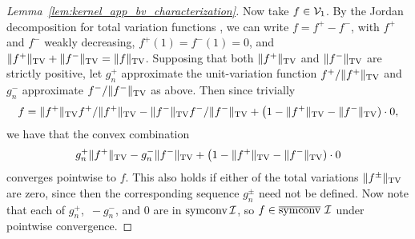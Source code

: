 \begin{proof}[Lemma~\ref{lem:kernel_app_bv_characterization}]
  Now take $f \in \mathcal{V}_1$.
  By the Jordan decomposition for
  total variation functions
  \citep{royden1988real},
  we can write
  $f = f^+ - f^-$,
  with
  $f^+$ and $f^-$ weakly decreasing,
  $f^+(1) = f^-(1) = 0$,
  and
  $\|f^+\|_{\mathrm{TV}} + \|f^-\|_{\mathrm{TV}} = \|f\|_{\mathrm{TV}}$.
  Supposing that both
  $\|f^+\|_{\mathrm{TV}}$ and $\|f^-\|_{\mathrm{TV}}$
  are strictly positive, let
  $g_n^+$ approximate
  the unit-variation function
  $f^+/\|f^+\|_{\mathrm{TV}}$
  and
  $g_n^-$ approximate $f^-/\|f^-\|_{\mathrm{TV}}$
  as above.
  Then since trivially
  \begin{align*}
    f =
    \|f^+\|_{\mathrm{TV}} f^+ / \|f^+\|_{\mathrm{TV}}
    - \|f^-\|_{\mathrm{TV}} f^- / \|f^-\|_{\mathrm{TV}}
    + \big(1 - \|f^+\|_{\mathrm{TV}} - \|f^-\|_{\mathrm{TV}}) \cdot 0,
  \end{align*}
  we have that
  the convex combination
  \begin{align*}
    g_n^+ \|f^+\|_{\mathrm{TV}}
    - g_n^- \|f^-\|_{\mathrm{TV}}
    + \big(1 - \|f^+\|_{\mathrm{TV}} - \|f^-\|_{\mathrm{TV}}) \cdot 0
  \end{align*}
  converges pointwise to $f$.
  This also holds if either of the total variations
  $\|f^\pm\|_{\mathrm{TV}}$
  are zero,
  since then the corresponding sequence $g_n^\pm$
  need not be defined.
  Now note that each of
  $g_n^+$, $\,-g_n^-$, and $0$
  are in $\operatorname{symconv} \mathcal{I}$, so
  $f \in \overline{\operatorname{symconv}} \ \mathcal{I}$
  under pointwise convergence.
\end{proof}


